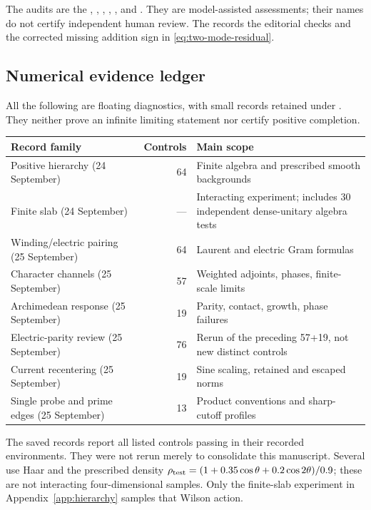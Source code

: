 The audits are the
,
,
,
,
,
and
.
They are model-assisted assessments; their names do not
certify independent human review. The
records the editorial checks and the corrected missing
addition sign in \eqref{eq:two-mode-residual}.

\subsection{Numerical evidence ledger}
All the following are floating diagnostics, with small
records retained under .
They neither prove an infinite limiting statement nor
certify positive completion.
\begin{center}
\begin{tabularx}{\textwidth}{@{}XrX@{}}
\toprule
Record family & Controls & Main scope\\
\midrule
Positive hierarchy (24 September) & 64 &
Finite algebra and prescribed smooth backgrounds\\
Finite slab (24 September) & --- &
Interacting experiment; includes 30 independent dense-unitary algebra tests\\
Winding/electric pairing (25 September) & 64 &
Laurent and electric Gram formulas\\
Character channels (25 September) & 57 &
Weighted adjoints, phases, finite-scale limits\\
Archimedean response (25 September) & 19 &
Parity, contact, growth, phase failures\\
Electric-parity review (25 September) & 76 &
Rerun of the preceding 57+19, not new distinct controls\\
Current recentering (25 September) & 19 &
Sine scaling, retained and escaped norms\\
Single probe and prime edges (25 September) & 13 &
Product conventions and sharp-cutoff profiles\\
\bottomrule
\end{tabularx}
\end{center}
The saved records report all listed controls passing
in their recorded environments. They were not rerun
merely to consolidate this manuscript. Several use
Haar and the prescribed density
$\rho_{\rm test}=(1+0.35\cos\theta+0.2\cos2\theta)/0.9$;
these are not interacting four-dimensional samples.
Only the finite-slab experiment in
Appendix~\ref{app:hierarchy} samples that Wilson action.

